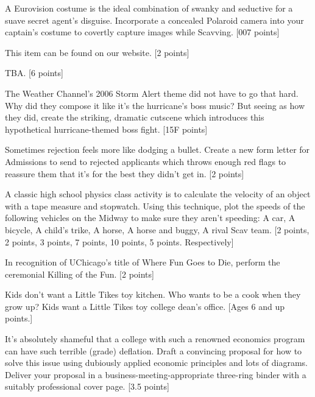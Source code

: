 \documentclass{book}
\begin{document}
\begin{list}{}{}
\item A Eurovision costume is the ideal combination of swanky and seductive for a suave secret agent's disguise. Incorporate a concealed Polaroid camera into your captain’s costume to covertly capture images while Scavving. [007 points]
\item This item can be found on our website. [2 points] %
\item TBA. [6 points] %
\item The Weather Channel’s 2006 Storm Alert theme did not have to go that hard. Why did they compose it like it's the hurricane's boss music? But seeing as how they did, create the striking, dramatic cutscene which introduces this hypothetical hurricane-themed boss fight. [15\textdegree F points]
\item Sometimes rejection feels more like dodging a bullet. Create a new form letter for Admissions to send to rejected applicants which throws enough red flags to reassure them that it’s for the best they didn't get in. [2 points]
\item A classic high school physics class activity is to calculate the velocity of an object with a tape measure and stopwatch. Using this technique, plot the speeds of the following vehicles on the Midway to make sure they aren't speeding: A car, A bicycle, A child's trike, A horse, A horse and buggy, A rival Scav team. [2 points, 2 points, 3 points, 7 points, 10 points, 5 points. Respectively]
\item In recognition of UChicago's title of Where Fun Goes to Die, perform the ceremonial Killing of the Fun. [2 points]
\item Kids don't want a Little Tikes toy kitchen. Who wants to be a cook when they grow up? Kids want a Little Tikes toy college dean's office. [Ages 6 and up points.]
\item It's absolutely shameful that a college with such a renowned economics program can have such terrible (grade) deflation. Draft a convincing proposal for how to solve this issue using dubiously applied economic principles and lots of diagrams. Deliver your proposal in a business-meeting-appropriate three-ring binder with a suitably professional cover page. [3.5 points]

\end{list}
\end{document}

